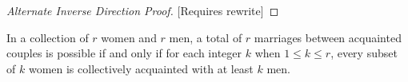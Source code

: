 \begin{proof}[Alternate Inverse Direction Proof]

  [Requires rewrite]
\end{proof}

\begin{theorem}
  In a collection of \(r\) women and \(r\) men, a total of \(r\) marriages 
  between acquainted couples is possible if and only if for each integer \(k\)
  when \(1 \leq k \leq r\), every subset of \(k\) women is collectively 
  acquainted with at least \(k\) men.
\end{theorem}

